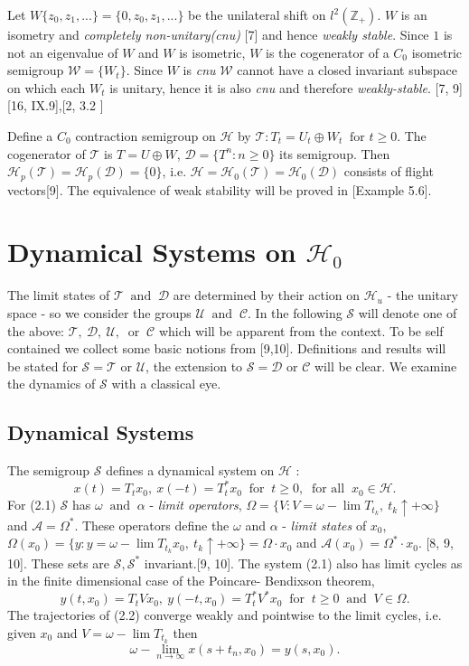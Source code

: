 \documentclass[req no]{amsart}[16pt]
\theoremstyle{plain}
\theoremstyle{definition}
\numberwithin{equation}{section}\setcounter{page}{1}
\def\m{\mbox}
\def\D{\displaystyle}
\def\ma{\m{ and }}
\def\mo{\m{ or }}
\def\mfa{\m{ for all }}
\def\mf{\m{ for }}
\def\o{\omega}
\def\O{\Omega}
\def\D{\mathcal{D}}
\def\h{\mathcal{H}}
\def\T {\mathcal{T}}
\def\s{\mathcal{S}}
\def\W{\mathcal{W}}
\def\C{\mathcal{C}}
\def\U{\mathcal{U}}
\def\lni{\lim\limits_{n\to\infty}}
\begin{document}
Let $W\{z_{0}, z_{1},... \} = \{0, z_{0}, z_{1},... \}$ be the unilateral shift on ${l^{2}(\mathbb{Z}_{+})}$. $ W$ is an isometry and \emph{completely non-unitary(cnu)} [7] and hence \emph{weakly stable}. Since $1$ is not an eigenvalue of $W$ and $W$ is isometric,  $W$ is the cogenerator of a $C_{0}$ isometric semigroup $\W = \{W_{t}\}$. Since $W$ is \emph{cnu} $\W$ cannot have a closed invariant subspace on which each $W_{t}$ is unitary, hence it is also \emph{cnu} and therefore \emph{weakly-stable}. [7, 9]  [16, IX.9],[2, 3.2 ]

Define a $C_{0}$ contraction semigroup on $\h$ by $\T: T_{t} = U_{t} \oplus W_{t}~\mf t\geq 0$. The cogenerator of $\T$ is $T = U \oplus W$, $\D =\{T^{n}: n \geq 0 \}$ its semigroup. Then $\h_p(\mathcal{T}) = \h_p(\mathcal{D})=\{0\}$, i.e. $\h = \h_0(\mathcal{T})=\h_0(\mathcal{D})$ consists of flight vectors[9]. The equivalence of weak stability will be proved in [Example 5.6].


\section{Dynamical Systems on $\h_{0}$ }
The limit states of $\T ~\ma ~ \D$ are determined by their action on $\h_{u}$ - the unitary space - so we consider the groups  $\U ~\ma ~ \C$.
In the following $\s$ will denote one of the above: $\mathcal{T} ,~\mathcal{D},~ \U, ~\mo~ \C$ which will be apparent from the context. To be self contained we collect some basic notions from [9,10]. Definitions and results will be stated for $\s =\T$ or $ \U$, the extension to $\s = \D \mo \C$ will be clear. We examine the dynamics of $\s$ with a classical eye.
\subsection{Dynamical Systems}
The semigroup $\s$ defines a dynamical system on $\h$ :
\begin{equation}\label{eqn1}
  x(t)=  T_t x_{0},~ x(-t)= T^{*}_t x_{0} ~\mf~ t \geq 0, ~\mfa ~ x_{0} \in \h.
\end{equation}
For (2.1) $\s$ has $\omega ~\ma~\alpha$ - \emph{limit operators}, $\Omega = \{V : V = \o- \lim  T_{t_{k}} ,~  t_{k}\uparrow + \infty \}$ and $\mathcal{A} = \Omega^{*}$. These operators define the $\omega$ and $\alpha$ -  \emph{limit states} of $x_{0}$, $ \Omega(x_{0})=\{y :y=\o-\lim  T_{t_{k}} x_{0},~ t_{k} \uparrow + \infty \} = \Omega \cdot x_{0}$ and  $ \mathcal{A}(x_{0})= \Omega^{*} \cdot x_{0}$. [8, 9, 10]. These sets are $\s, \s^{*}$ invariant.[9, 10]. The system (2.1) also has limit cycles as in the finite dimensional case of the Poincare- Bendixson theorem,
\begin{equation}\label{eqn2}
  y(t,x_{0}) = T_{t} V x_{0},~ y(-t,x_{0})= T^{*}_{t}V^{*} x_{0} ~\mf~ t \geq 0~\ma~ V \in \O.
\end{equation} $$$$
The trajectories of (2.2) converge weakly and pointwise to the limit cycles, i.e. given $x_{0}$ and $V = \o- \lim  T_{t_{k}}$ then
\begin{equation}\label{eqn3}
  \o -\lni x(s+t_{n},x_{0})= y(s,x_{0}).
\end{equation}
\end{document}
